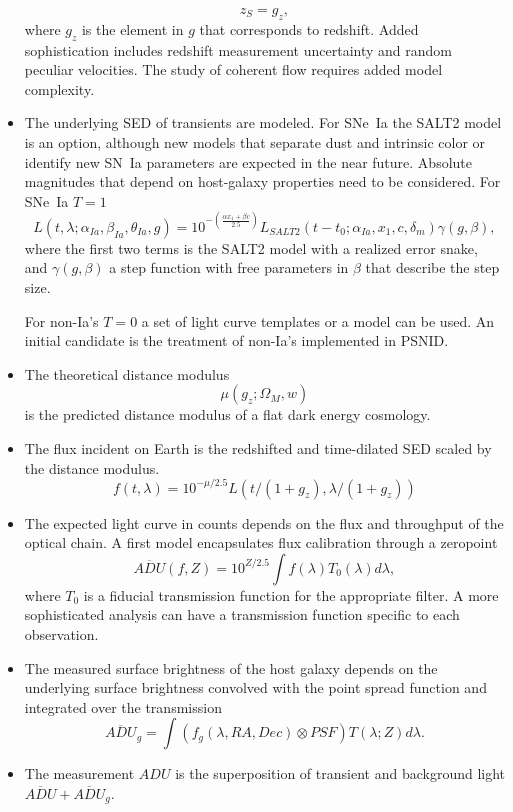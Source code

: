 \documentclass[preprint,3p]{elsarticle}
\begin{document}
\begin{itemize}
\begin{equation}
z_S = g_z,
\end{equation}
where $g_z$ is the element in $g$ that corresponds to redshift.
Added sophistication includes redshift
measurement uncertainty and random peculiar velocities. The study of coherent
flow requires added model complexity.
\item The underlying SED of transients are modeled.  For SNe~Ia the SALT2 model
is an option, although new models that separate dust and intrinsic color or
identify new SN~Ia parameters are expected in the near future.  Absolute magnitudes
that depend on host-galaxy properties need to be considered. 
For SNe~Ia $T=1$
\begin{equation}
L(t,\lambda; \alpha_{Ia}, \beta_{Ia}, \theta_{Ia}, g)  =10^{-\left(\frac{\alpha x_1 + \beta c}{2.5}\right)}L_{SALT2}(t-t_0; \alpha_{Ia}, x_1, c, \delta_m) \gamma(g, \beta) ,
\end{equation}
where the first two terms is the SALT2 model with a realized error snake,
and $\gamma(g, \beta)$ a step function with free parameters in $\beta$ that
describe the step size.

For non-Ia's $T=0$ a set of light curve templates or a model can be used.
An initial candidate is the treatment of non-Ia's implemented in PSNID.
\item The theoretical distance modulus
\begin{equation}
\mu(g_z; \Omega_M, w)
\end{equation}
is the predicted distance modulus of a flat dark energy cosmology.
\item The flux incident on Earth is the redshifted and time-dilated SED scaled
by the distance modulus.
\begin{equation}
f(t,\lambda) = 10^{-\mu/2.5} L\left(t/(1+g_z),\lambda/(1+g_z)\right)
\end{equation}
\item The expected light curve in counts depends on the flux and throughput of the
optical chain.  A first model encapsulates flux calibration through a zeropoint
\begin{equation}
\overline{\mathit{ADU}}(f, Z) = 10^{Z/2.5} \int  f(\lambda) T_0(\lambda)d\lambda,
\end{equation}
where $T_0$ is a fiducial transmission function for the appropriate filter.  A more sophisticated
analysis can have a transmission function specific to each observation.
\item The measured surface brightness of the host galaxy depends on the underlying
surface brightness convolved with the point spread function and integrated
over the transmission
\begin{equation}
\overline{\mathit{ADU}}_g =    \int (f_g(\lambda, RA, Dec) \otimes PSF) T(\lambda;Z)d\lambda.
\end{equation}
\item The measurement $\mathit{ADU}$ is the superposition of transient and background
light $\overline{\mathit{ADU}} + \overline{\mathit{ADU}}_g$.
\end{itemize}
\end{document}
